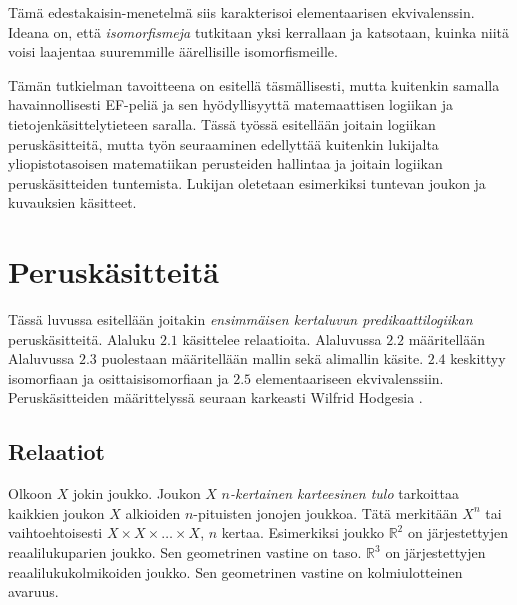 \documentclass[finnish]{tktltiki2}
\theoremstyle{definition}
\theoremstyle{remark}
\begin{document}
Tämä edestakaisin-menetelmä siis karakterisoi elementaarisen ekvivalenssin. Ideana on, että \textit{isomorfismeja} tutkitaan yksi kerrallaan ja katsotaan, kuinka niitä voisi laajentaa suuremmille äärellisille isomorfismeille.

Tämän tutkielman tavoitteena on esitellä täsmällisesti, mutta kuitenkin samalla havainnollisesti EF-peliä ja sen hyödyllisyyttä matemaattisen logiikan ja tietojenkäsittelytieteen saralla. Tässä työssä esitellään joitain logiikan peruskäsitteitä, mutta työn seuraaminen edellyttää kuitenkin lukijalta yliopistotasoisen matematiikan perusteiden hallintaa ja joitain logiikan peruskäsitteiden tuntemista. Lukijan oletetaan esimerkiksi tuntevan joukon ja kuvauksien käsitteet.

\section{Peruskäsitteitä}
Tässä luvussa esitellään joitakin \textit{ensimmäisen kertaluvun predikaattilogiikan} peruskäsitteitä. Alaluku $2.1$ käsittelee relaatioita. Alaluvussa $2.2$ määritellään Alaluvussa $2.3$ puolestaan määritellään mallin sekä alimallin käsite. $2.4$ keskittyy isomorfiaan ja osittaisisomorfiaan ja $2.5$ elementaariseen ekvivalenssiin. Peruskäsitteiden määrittelyssä seuraan karkeasti Wilfrid Hodgesia \cite{Hod97}.

\subsection{Relaatiot}
Olkoon $X$ jokin joukko. Joukon $X$ $n$\textit{-kertainen karteesinen tulo} tarkoittaa kaikkien joukon $X$ alkioiden $n$-pituisten jonojen joukkoa. Tätä merkitään $X^n$ tai vaihtoehtoisesti $X \times X \times \ldots \times X$, $n$ kertaa. Esimerkiksi joukko $\mathbb{R}^2$ on järjestettyjen reaalilukuparien joukko. Sen geometrinen vastine on taso. $\mathbb{R}^3$ on järjestettyjen reaalilukukolmikoiden joukko. Sen geometrinen vastine on kolmiulotteinen avaruus. 
\end{document}
